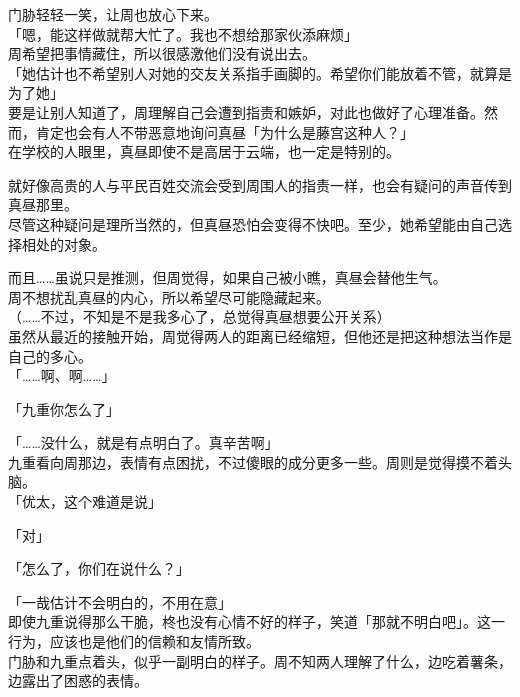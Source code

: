 门胁轻轻一笑，让周也放心下来。\\

「嗯，能这样做就帮大忙了。我也不想给那家伙添麻烦」\\

周希望把事情藏住，所以很感激他们没有说出去。\\

「她估计也不希望别人对她的交友关系指手画脚的。希望你们能放着不管，就算是为了她」\\

要是让别人知道了，周理解自己会遭到指责和嫉妒，对此也做好了心理准备。然而，肯定也会有人不带恶意地询问真昼「为什么是藤宫这种人？」\\

在学校的人眼里，真昼即使不是高居于云端，也一定是特别的。

就好像高贵的人与平民百姓交流会受到周围人的指责一样，也会有疑问的声音传到真昼那里。\\

尽管这种疑问是理所当然的，但真昼恐怕会变得不快吧。至少，她希望能由自己选择相处的对象。

而且……虽说只是推测，但周觉得，如果自己被小瞧，真昼会替他生气。\\

周不想扰乱真昼的内心，所以希望尽可能隐藏起来。\\

（……不过，不知是不是我多心了，总觉得真昼想要公开关系）\\

虽然从最近的接触开始，周觉得两人的距离已经缩短，但他还是把这种想法当作是自己的多心。\\

「……啊、啊……」

「九重你怎么了」

「……没什么，就是有点明白了。真辛苦啊」\\

九重看向周那边，表情有点困扰，不过傻眼的成分更多一些。周则是觉得摸不着头脑。\\

「优太，这个难道是说」

「对」

「怎么了，你们在说什么？」

「一哉估计不会明白的，不用在意」\\

即使九重说得那么干脆，柊也没有心情不好的样子，笑道「那就不明白吧」。这一行为，应该也是他们的信赖和友情所致。\\

门胁和九重点着头，似乎一副明白的样子。周不知两人理解了什么，边吃着薯条，边露出了困惑的表情。
